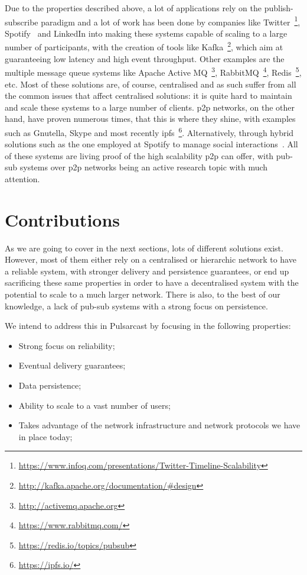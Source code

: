 Due to the properties described above, a lot of applications rely on the
publish-subscribe paradigm and a lot of work has been done by companies like
Twitter~\footnote{\url{https://www.infoq.com/presentations/Twitter-Timeline-Scalability}},
Spotify~\cite{Setty2013} and LinkedIn into making these systems capable of
scaling to a large number of participants, with the creation of tools like
Kafka~\footnote{\url{http://kafka.apache.org/documentation/\#design}}, which
aim at guaranteeing low latency and high event throughput. Other examples are
the multiple message queue systems like Apache Active
MQ~\footnote{\url{http://activemq.apache.org}},
RabbitMQ~\footnote{\url{https://www.rabbitmq.com/}},
Redis~\footnote{\url{https://redis.io/topics/pubsub}}, etc. Most of these
solutions are, of course, centralised and as such suffer from all the common
issues that affect centralised solutions: it is quite hard to maintain and
scale these systems to a large number of clients. \acrfull{p2p} networks, on
the other hand, have proven numerous times, that this is where they shine, with
examples such as Gnutella, Skype and most recently
\acrshort{ipfs}~\footnote{\url{https://ipfs.io/}}. Alternatively, through
hybrid solutions such as the one employed at Spotify to manage social
interactions~\cite{Setty2013}. All of these systems are living proof of the
high scalability \acrshort{p2p} can offer, with pub-sub systems over
\acrshort{p2p} networks being an active research topic with much attention.

\section{Contributions}

As we are going to cover in the next sections, lots of different solutions
exist. However, most of them either rely on a centralised or hierarchic network
to have a reliable system, with stronger delivery and persistence guarantees,
or end up sacrificing these same properties in order to have a decentralised
system with the potential to scale to a much larger network. There is also, to
the best of our knowledge, a lack of pub-sub systems with a strong focus on
persistence.

We intend to address this in Pulsarcast by focusing in the following
properties:

\begin{itemize}
  \item
    Strong focus on reliability;
  \item
    Eventual delivery guarantees;
  \item
    Data persistence;
  \item
    Ability to scale to a vast number of users;
  \item
    Takes advantage of the network infrastructure and network protocols we have in place today;
\end{itemize}

